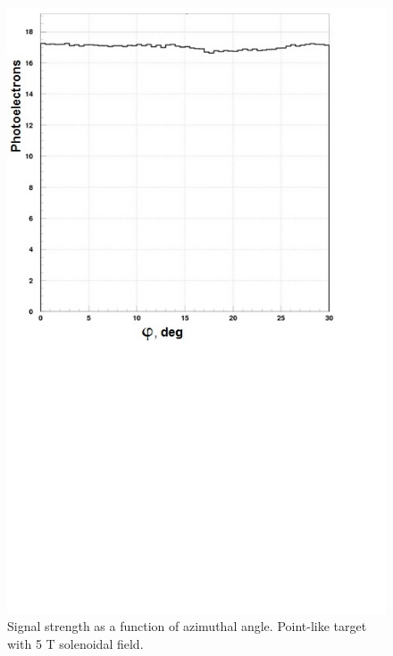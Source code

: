 \begin{figure}[!ht]
    \centering
    \includegraphics[width=1.0\linewidth,trim={0.0cm 9.4cm 0.0cm 0.0cm},clip]{images/Point_Targ_5T_Field_Phi.jpg}
    \caption{Signal strength as a function of azimuthal angle. Point-like target with 5 T solenoidal field.}
    \label{fig:Point_Targ_5T_Field_Phi}
\end{figure}

